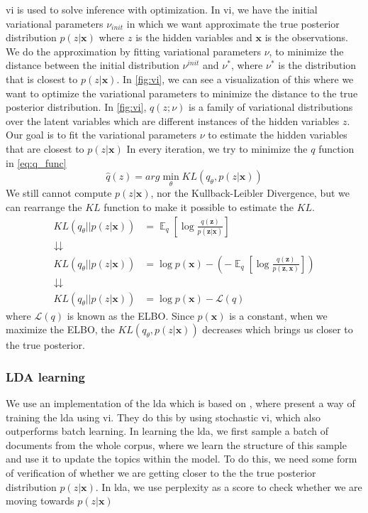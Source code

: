\gls{vi} is used to solve inference with optimization.
In \gls{vi}, we have the initial variational parameters $\nu_{init}$ in which we want approximate the true posterior distribution $p(z|\textbf{x})$ where $z$ is the hidden variables and $\textbf{x}$ is the observations.
We do the approximation by fitting variational parameters $\nu$, to minimize the distance between the initial distribution $\nu^{init}$ and $\nu^*$, where $\nu^*$ is the distribution that is closest to $p(z|\textbf{x})$.
In \autoref{fig:vi}, we can see a visualization of this where we want to optimize the variational parameters to minimize the distance to the true posterior distribution.
In \autoref{fig:vi}, $q(z; \nu)$ is a family of variational distributions over the latent variables which are different instances of the hidden variables $z$.
Our goal is to fit the variational parameters $\nu$ to estimate the hidden variables that are closest to $p(z|\textbf{x})$
In every iteration, we try to minimize the $q$ function in \autoref{eq:q_func} 
\begin{equation}\label{eq:q_func}
	\hat{q}(z) = arg \min_{\theta} K\!L(q_\theta, p(z|\textbf{x}))
\end{equation}
We still cannot compute $p(z|\textbf{x})$, nor the Kullback-Leibler Divergence, but we can rearrange the $K\!L$ function to make it possible to estimate the $K\!L$.
\begin{align}
	K\!L(q_\theta || p(z|\textbf{x})) &= \mathop{\mathbb{E}}_{q}[\log\frac{q(\textbf{z})}{p(\textbf{z}|\textbf{x})}]\\
	\downdownarrows \nonumber \\
	K\!L(q_\theta || p(z|\textbf{x})) &= \log p(\textbf{x}) - (-\mathop{\mathbb{E}}_{q}[\log\frac{q(\textbf{z})}{p(\textbf{z},\textbf{x})}]) \\
	\downdownarrows \nonumber \\
	K\!L(q_\theta || p(z|\textbf{x})) &= \log p(\textbf{x}) - \mathcal{L}(q)
\end{align}
where $\mathcal{L}(q)$ is known as the ELBO.
Since $p(\textbf{x})$ is a constant, when we maximize the ELBO, the $K\!L(q_\theta, p(z|\textbf{x}))$ decreases which brings us closer to the true posterior.


\subsubsection*{LDA learning}
We use an implementation of the \gls{lda} which is based on \cite{blei2010online}, where \citeauthor{blei2010online} present a way of training the \gls{lda} using \gls{vi}.
They do this by using stochastic \gls{vi}, which also outperforms batch learning.
In learning the \gls{lda}, we first sample a batch of documents from the whole corpus, where we learn the structure of this sample and use it to update the topics within the model.
To do this, we need some form of verification of whether we are getting closer to the the true posterior distribution $p(z|\textbf{x})$.
In \gls{lda}, we use perplexity as a score to check whether we are moving towards $p(z|\textbf{x})$
